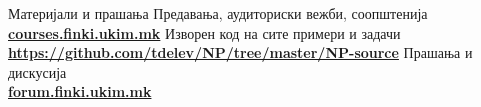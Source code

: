 \begin{frame}{Материјали и прашања}{}
    Предавања, аудиториски вежби, соопштенија\\
    \href{http://courses.finki.ukim.mk/}{\textbf{courses.finki.ukim.mk}}
    \vfill
       Изворен код на сите примери и задачи\\
    \href{https://github.com/tdelev/NP/tree/master/NP-source}{\textbf{https://github.com/tdelev/NP/tree/master/NP-source}}
    \vfill
    Прашања и дискусија\\
    \href{http://forum.finki.ukim.mk}{\textbf{forum.finki.ukim.mk}}
\end{frame}